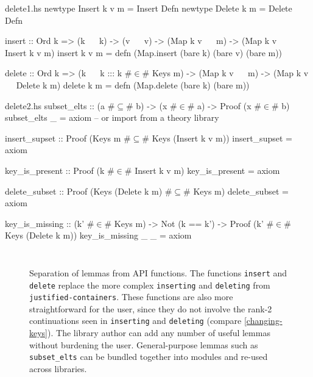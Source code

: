 \documentclass[format=sigplan, review=false, screen=true]{acmart}
\begin{document}
\begin{filecontents*}{delete1.hs}
newtype Insert k v m = Insert Defn
newtype Delete k m   = Delete Defn

insert :: Ord k
       => (k ~~ k)
       -> (v ~~ v)
       -> (Map k v ~~ m)
       -> (Map k v ~~ Insert k v m)
insert k v m =
    defn (Map.insert (bare k) (bare v) (bare m))
       
delete :: Ord k
       => (k ~~ k ::: k #$\in$# Keys m)
       -> (Map k v ~~ m)
       -> (Map k v ~~ Delete k m)
delete k m = defn (Map.delete (bare k) (bare m))
\end{filecontents*}
\begin{filecontents*}{delete2.hs}
subset_elts :: (a #$\subseteq$# b) -> (x #$\in$# a) -> Proof (x #$\in$# b)
subset_elts _ = axiom -- or import from a theory library

insert_supset :: Proof (Keys m #$\subseteq$# Keys (Insert k v m))
insert_supset = axiom

key_is_present :: Proof (k #$\in$# Insert k v m)
key_is_present = axiom

delete_subset :: Proof (Keys (Delete k m) #$\subseteq$# Keys m)
delete_subset = axiom

key_is_missing  :: (k' #$\in$# Keys m)
                -> Not (k == k')
                -> Proof (k' #$\in$# Keys (Delete k m))
key_is_missing _ _ = axiom                
\end{filecontents*}

\begin{figure*}
  \begin{minipage}{0.49\textwidth}
    \inputminted{haskell}{delete1.hs}
  \end{minipage}
  \begin{minipage}{0.49\textwidth}
    \inputminted{haskell}{delete2.hs}
  \end{minipage}
  \caption{Separation of lemmas from API functions. The functions
    \texttt{insert} and \texttt{delete} replace the more complex
    \texttt{inserting} and \texttt{deleting} from \texttt{justified-containers}.
    These functions are also more straightforward for the user, since they do
    not involve the rank-2 continuations seen in \texttt{inserting} and \texttt{deleting} (compare \cref{changing-keys}).
    The library author can add any number of useful lemmas without burdening the
    user. General-purpose lemmas such as \texttt{subset\_elts} can be bundled
    together into modules and re-used across libraries.\label{lemma-demo}}
\end{figure*}
\end{document}
